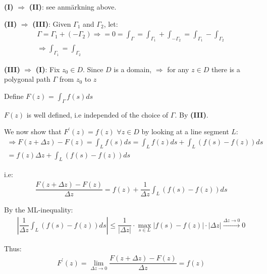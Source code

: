 \begin{prf}[]{}
  \textbf{(I) }$\Rightarrow$\textbf{ (II)}: see anmärkning above.
  \par\bigskip
  \noindent\textbf{(II) }$\Rightarrow$\textbf{ (III)}: Given $\Gamma_1$ and $\Gamma_2$, let:
  \begin{equation*}
    \begin{gathered}
      \Gamma = \Gamma_1+(-\Gamma_2)\Rightarrow = 0 = \int_{\Gamma} = \int_{\Gamma_1}+\int_{-\Gamma_2} = \int_{\Gamma_1}-\int_{\Gamma_2}\\
      \Rightarrow \int_{\Gamma_1} = \int_{\Gamma_2}
    \end{gathered}
  \end{equation*}
  \par\bigskip
  \noindent\textbf{(III) }$\Rightarrow$\textbf{ (I)}: Fix $z_0\in D$. Since $D$ is a domain, $\Rightarrow$ for any $z\in D$ there is a polygonal path $\Gamma$ from $z_0$ to $z$
  \par\bigskip
  \noindent Define $F(z)$ = $\int_{\Gamma}f(s)ds$
  \par\bigskip
  \noindent $F(z)$ is well defined, i.e independed of the choice of $\Gamma$. By \textbf{(III)}.
  \par\bigskip
  \noindent We now show that $F^{\prime}(z) = f(z)$ $\forall z\in D$ by looking at a line segment $L$:
  \begin{equation*}
    \begin{gathered}
      \Rightarrow F(z+\Delta z)-F(z) = \int_{L}f(s)ds = \int_{L}f(z)ds +\int_{L}(f(s)-f(z))ds\\
      = f(z)\Delta z + \int_{L}(f(s)-f(z))ds
    \end{gathered}
  \end{equation*}\par
  \noindent i.e:
  \begin{equation*}
    \begin{gathered}
      \dfrac{F(z+\Delta z)-F(z)}{\Delta z} = f(z)+\dfrac{1}{\Delta z}\int_{L}(f(s)-f(z))ds
    \end{gathered}
  \end{equation*}\par
  \noindent By the ML-inequality:
  \begin{equation*}
    \begin{gathered}
      \left|\dfrac{1}{\Delta z}\int_{L}(f(s)-f(z))ds\right|\leq\dfrac{1}{\left|\Delta z\right|}\cdot\max_{s\in L}\left|f(s)-f(z)\right|\cdot\left|\Delta z\right|\stackrel{\Delta z\to0}{\to}0
    \end{gathered}
  \end{equation*}\par
  \noindent Thus:
  \begin{equation*}
    \begin{gathered}
      F^{\prime}(z) = \lim_{\Delta z\to0}\dfrac{F(z+\Delta z)-F(z)}{\Delta z} = f(z)
    \end{gathered}
  \end{equation*}
\end{prf}
\par\bigskip
